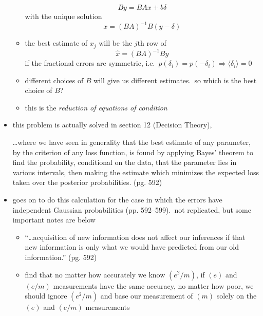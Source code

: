 \documentclass[../jaynes_prob_theory_notes.tex]{subfiles}
\begin{document}
\begin{itemize}
\begin{itemize}
\begin{equation*}
                                By = BAx + b\delta
                            \end{equation*}
                            with the unique solution
                            \begin{equation*} 
                                x = {(BA)}^{-1}B(y-\delta)
                            \end{equation*}
                        \item the best estimate of \(x_j\) will be the \(j\)th row of 
                            \begin{equation*} 
                                \hat{x} = {(BA)}^{-1}By
                            \end{equation*}
                            if the fractional errors are symmetric, i.e.\ \(p(\delta_i) = p(-\delta_i) \Rightarrow \langle \delta_i \rangle = 0\)
                        \item different choices of \(B\) will give us different estimates.\ so which is the best choice of \(B\)?
                        \item this is the \textit{reduction of equations of condition}
                    \end{itemize}
                \item this problem is actually solved in section 12 (Decision Theory),
                    \begin{displayquote} 
                        \ldots where we have seen in generality that the best estimate of any parameter, by the criterion of any loss function, is found by applying Bayes' theorem to find the probability, conditional on the data, that the parameter lies in various intervals, then making the estimate which minimizes the expected loss taken over the posterior probabilities. (pg. 592)
                    \end{displayquote}
                \item goes on to do this calculation for the case in which the errors have independent Gaussian probabilities (pp. 592--599).\ not replicated, but some important notes are below
                    \begin{itemize} 
                        \item ``\ldots acquisition of new information does not affect our inferences if that new information is only what we would have predicted from our old information.'' (pg. 592)
                        \item find that no matter how accurately we know \((e^2/m)\), if \((e)\) and \((e/m)\) measurements have the same accuracy, no matter how poor, we should ignore \((e^2/m)\) and base our measurement of \((m)\) solely on the \((e)\) and \((e/m)\) measurements
                    \end{itemize}
            \end{itemize}
\end{document}
